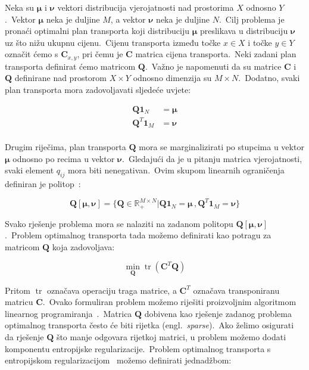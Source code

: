 \documentclass[diplomskirad]{fer}
\begin{document}
Neka su $\bm{\mu}$ i $\bm{\nu}$ vektori distribucija vjerojatnosti nad prostorima $X$ odnosno $Y$.\ Vektor $\bm{\mu}$ neka je duljine $M$, a vektor $\bm{\nu}$ neka je duljine $N$.\
Cilj problema je pronaći optimalni plan transporta koji distribuciju $\bm{\mu}$ preslikava u distribuciju $\bm{\nu}$ uz što nižu ukupnu cijenu.\ 
Cijenu transporta između točke $x \in X$ i točke $y \in Y$ označit ćemo s $\bm{C}_{x,y}$, pri čemu je $\bm{C}$ matrica cijena transporta.\ 
Neki zadani plan transporta definirat ćemo matricom $\bm{Q}$.\ Važno je napomenuti da su matrice $\bm{C}$ i $\bm{Q}$ definirane nad prostorom $X \times Y$ odnosno dimenzija su $M \times N$.\ 
Dodatno, svaki plan transporta mora zadovoljavati sljedeće uvjete:

\begin{equation}
  \begin{aligned}
    \bm{Q} \bm{1}_N &= \bm{\mu} \\
    \bm{Q}^T \bm{1}_M &= \bm{\nu} \\
  \end{aligned}
  \label{eq:ot_plan_conds}
\end{equation}

Drugim riječima, plan transporta $\bm{Q}$ mora se marginalizirati po stupcima u vektor $\bm{\mu}$ odnosno po recima u vektor $\bm{\nu}$.\ Gledajući da je u pitanju matrica vjerojatnosti, svaki element $q_{ij}$ mora biti nenegativan.\ 
Ovim skupom linearnih ograničenja definiran je politop~\cite{ziegler1993lectures}:

\begin{equation}
  \bm{Q}\left[ \bm{\mu}, \bm{\nu} \right] = \{ \bm{Q} \in \mathbb{R}_{+}^{M \times N} | \bm{Q} \bm{1}_N = \bm{\mu}\,, \bm{Q}^T \bm{1}_M = \bm{\nu} \}
  \label{eq:ot_polytope}
\end{equation}

Svako rješenje problema mora se nalaziti na zadanom politopu $\bm{Q}\left[ \bm{\mu}, \bm{\nu} \right]$.\ Problem optimalnog transporta tada možemo definirati kao potragu za matricom $\bm{Q}$ koja zadovoljava:

\begin{equation}
  \min_{\bm{Q}} \operatorname{tr}(\bm{C}^T \bm{Q})
  \label{eq:ot_basic}
\end{equation}

Pritom $\operatorname{tr}$ označava operaciju traga matrice, a $\bm{C}^T$ označava transponiranu matricu $\bm{C}$.\ Ovako formuliran problem možemo riješiti proizvoljnim algoritmom linearnog programiranja~\cite{dantzig2002linear}.\ 
Matrica $\bm{Q}$ dobivena kao rješenje zadanog problema optimalnog transporta često će biti rijetka (engl.\ \textit{sparse}).\ 
Ako želimo osigurati da rješenje $\bm{Q}$ što manje odgovara rijetkoj matrici, u problem možemo dodati komponentu entropijske regularizacije.\ 
Problem optimalnog transporta s entropijskom regularizacijom~\cite{genevay2019entropy} možemo definirati jednadžbom:
\end{document}
